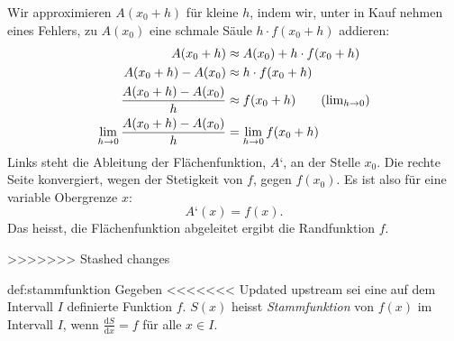 \documentclass[%
<<<<<<< Updated upstream
11pt,%
twoside,%
titlepage,%
german,%
headsepline%
]{scrartcl}
\begin{document}
\begin{center}
\end{center}

Wir approximieren $A(x_0+h)$ für kleine $h$, indem wir, unter in Kauf nehmen eines Fehlers, zu $A(x_0)$ eine schmale Säule $h\cdot f(x_0+h)$ addieren:
\begin{align*}
     A(x_0+h) &\approx A(x_0)+h\cdot f(x_0+h)\\ 
     A(x_0+h) - A(x_0) &\approx h\cdot f(x_0+h)\\ 
     \frac{A(x_0+h) - A(x_0)}{h} &\approx f(x_0+h)\tag{$\lim_{h\to0}$}\\ 
     \lim_{h\to0}\frac{A(x_0+h) - A(x_0)}{h} &= \lim_{h\to0}f(x_0+h)
\end{align*}
Links steht die Ableitung der Flächenfunktion, $A‘$, an der Stelle $x_0$. Die rechte Seite konvergiert, wegen der Stetigkeit von $f$, gegen $f(x_0)$. Es ist also für eine variable Obergrenze $x$:
$$A‘(x)=f(x).$$
Das heisst, die Flächenfunktion abgeleitet ergibt die Randfunktion $f$.

>>>>>>> Stashed changes
\begin{cdef}[Stammfunktion]{def:stammfunktion}
Gegeben
<<<<<<< Updated upstream
sei eine auf dem Intervall $I$ definierte Funktion $f$. $S(x)$ heisst \emph{Stammfunktion} von $f(x)$ im Intervall $I$, wenn $\frac{\mathrm{d}S}{\mathrm{d}x}=f$ für alle $x\in I$.
\end{cdef}
\end{document}

